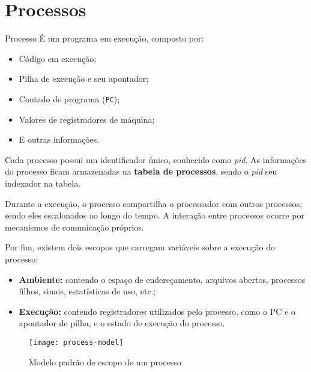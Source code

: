 \chapter{Processos}

\begin{definicao}{Processo}
  É um programa em execução, composto por:
  \begin{itemize}
    \item Código em execução;
    \item Pilha de execução e seu apontador;
    \item Contado de programa (\texttt{PC});
    \item Valores de registradores de máquina;
    \item E outras informações.
  \end{itemize}
\end{definicao}

Cada processo possui um identificador único, conhecido como \textit{pid}. As informações do processo ficam armazenadas na \textbf{tabela de processos}, sendo o \textit{pid} seu indexador na tabela.

Durante a execução, o processo compartilha o processador com outros processos, sendo eles escalonados ao longo do tempo. A interação entre processos ocorre por mecanismos de comunicação próprios.

Por fim, existem dois escopos que carregam variáveis sobre a execução do processo:

\begin{itemize}
  \item \textbf{Ambiente:} contendo o espaço de endereçamento, arquivos abertos, processos filhos, sinais, estatísticas de uso, etc.;

  \item \textbf{Execução:} contendo registradores utilizados pelo processo, como o PC e o apontador de pilha, e o estado de execução do processo.
\end{itemize}

\begin{figure}
  \centering
  \texttt{[image: process-model]}
  \caption{Modelo padrão de escopo de um processo}
  \label{fig:process-model}
\end{figure}
















